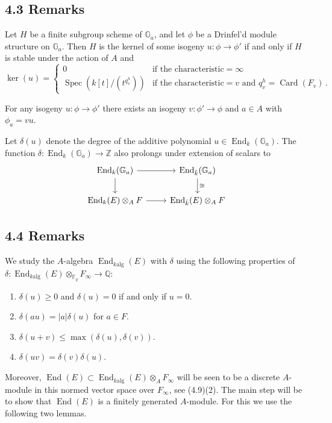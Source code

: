 \documentclass[12pt,a4paper]{article}
\theoremstyle{plain}
\theoremstyle{definition}
\theoremstyle{remark}
\DeclareMathOperator{\End}{End}
\DeclareMathOperator{\Spec}{Spec}
\DeclareMathOperator{\Card}{Card}
\begin{document}
\subsection*{4.3 Remarks}

Let $H$ be a finite subgroup scheme of $\mathbb{G}_a$, and let $\phi$ be a 
Drinfel'd module structure on $\mathbb{G}_a$. Then $H$ is the kernel of some 
isogeny $u\colon \phi \to \phi'$ if and only if $H$ is stable under the action 
of $A$ and
\[
\ker(u) = \begin{cases}
0 & \text{if the characteristic} = \infty \\[2mm]
\Spec(k[t]/(t^{q_v^h})) & \text{if the characteristic} = v \text{ and } 
q_v^h = \Card(F_v) \,.
\end{cases}
\]

For any isogeny $u\colon \phi \to \phi'$ there exists an isogeny 
$v\colon \phi' \to \phi$ and $a \in A$ with $\phi_a = vu$.

Let $\delta(u)$ denote the degree of the additive polynomial 
$u \in \End_k(\mathbb{G}_a)$. The function $\delta\colon \End_k(\mathbb{G}_a) \to \mathbb{Z}$ 
also prolongs under extension of scalars to
\[
\begin{tikzcd}
\End_k(\mathbb{G}_a) \arrow[r] \arrow[d] & \End_{\bar{k}}(\mathbb{G}_a) \arrow[d, "\cong"] \\
\End_k(E) \otimes_A F \arrow[r] & \End_{\bar{k}}(E) \otimes_A F
\end{tikzcd}
\]

\subsection*{4.4 Remarks}

We study the $A$-algebra $\End_{k\text{alg}}(E)$ with $\delta$ using the 
following properties of $\delta\colon \End_{k\text{alg}}(E) \otimes_{\mathbb{F}_q} F_\infty \to \mathbb{Q}$:
\begin{enumerate}[label=(\arabic*)]
\item $\delta(u) \geqslant 0$ and $\delta(u) = 0$ if and only if $u = 0$.
\item $\delta(au) = |a|\delta(u)$ for $a \in F$.
\item $\delta(u+v) \leqslant \max(\delta(u), \delta(v))$.
\item $\delta(uv) = \delta(v)\delta(u)$.
\end{enumerate}
Moreover, $\End(E) \subset \End_{k\text{alg}}(E) \otimes_A F_\infty$ will be seen 
to be a discrete $A$-module in this normed vector space over $F_\infty$, see 
(4.9)(2). The main step will be to show that $\End(E)$ is a finitely generated 
$A$-module. For this we use the following two lemmas.
\end{document}
